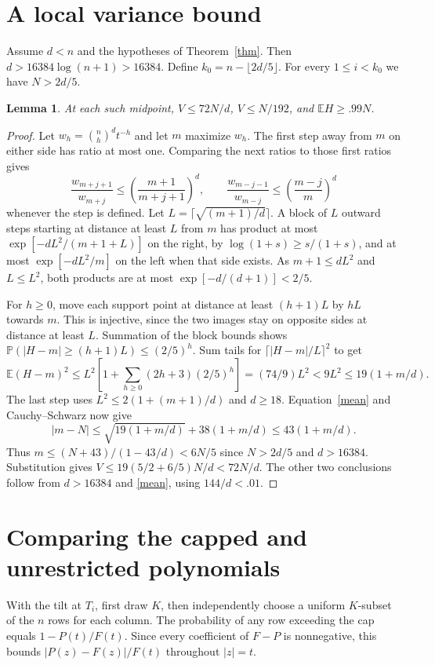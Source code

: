 \documentclass[11pt]{article}
\newtheorem{lemma}[theorem]{Lemma}
\newcommand{\E}{\mathbb E}
\newcommand{\Prob}{\mathbb P}
\begin{document}
\section{A local variance bound}
Assume $d<n$ and the hypotheses of Theorem~\ref{thm}. Then $d>16384\log(n+1)>16384$. Define $k_0=n-\lfloor2d/5\rfloor$. For every $1\le i<k_0$ we have $N>2d/5$.
\begin{lemma}\label{local}
At each such midpoint, $V\le72N/d$, $V\le N/192$, and $\E H\ge .99N$.
\end{lemma}
\begin{proof}
Let $w_h=\binom nh^d t^{-h}$ and let $m$ maximize $w_h$. The first step away from $m$ on either side has ratio at most one. Comparing the next ratios to those first ratios gives
\[
 \frac{w_{m+j+1}}{w_{m+j}}\le\left(\frac{m+1}{m+j+1}\right)^d,\qquad
 \frac{w_{m-j-1}}{w_{m-j}}\le\left(\frac{m-j}{m}\right)^d
\]
whenever the step is defined. Let $L=\lceil\sqrt{(m+1)/d}\rceil$. A block of $L$ outward steps starting at distance at least $L$ from $m$ has product at most $\exp[-dL^2/(m+1+L)]$ on the right, by $\log(1+s)\ge s/(1+s)$, and at most $\exp[-dL^2/m]$ on the left when that side exists. As $m+1\le dL^2$ and $L\le L^2$, both products are at most $\exp[-d/(d+1)]<2/5$.

For $h\ge0$, move each support point at distance at least $(h+1)L$ by $hL$ towards $m$. This is injective, since the two images stay on opposite sides at distance at least $L$. Summation of the block bounds shows $\Prob(|H-m|\ge(h+1)L)\le(2/5)^h$. Sum tails for $\lceil|H-m|/L\rceil^2$ to get
\[
 \E(H-m)^2\le L^2\left[1+\sum_{h\ge0}(2h+3)(2/5)^h\right]
 = (74/9)L^2 < 9L^2\le19(1+m/d).
\]
The last step uses $L^2\le2(1+(m+1)/d)$ and $d\ge18$. Equation~\eqref{mean} and Cauchy--Schwarz now give
\[
 |m-N|\le \sqrt{19(1+m/d)}+38(1+m/d)\le43(1+m/d).
\]
Thus $m\le(N+43)/(1-43/d)<6N/5$ since $N>2d/5$ and $d>16384$. Substitution gives $V\le19(5/2+6/5)N/d<72N/d$. The other two conclusions follow from $d>16384$ and \eqref{mean}, using $144/d<.01$.
\end{proof}

\section{Comparing the capped and unrestricted polynomials}
With the tilt at $T_i$, first draw $K$, then independently choose a uniform $K$-subset of the $n$ rows for each column. The probability of any row exceeding the cap equals $1-P(t)/F(t)$. Since every coefficient of $F-P$ is nonnegative, this bounds $|P(z)-F(z)|/F(t)$ throughout $|z|=t$.
\end{document}
